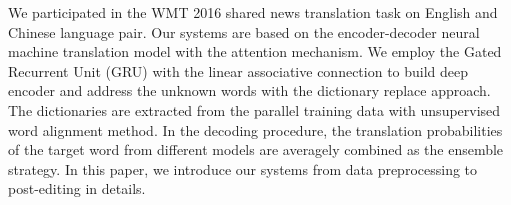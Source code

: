 We participated in the WMT 2016 shared news translation task on English and Chinese language pair. Our systems are based on the encoder-decoder neural machine translation model with the attention mechanism. We employ the Gated Recurrent Unit (GRU) with the linear associative connection to build deep encoder and address the unknown words with the dictionary replace approach. The dictionaries are extracted from the parallel training data with unsupervised word alignment method. In the decoding procedure, the translation probabilities of the target word from different models are averagely combined as the ensemble strategy. In this paper, we introduce our systems from data preprocessing to post-editing in details.
